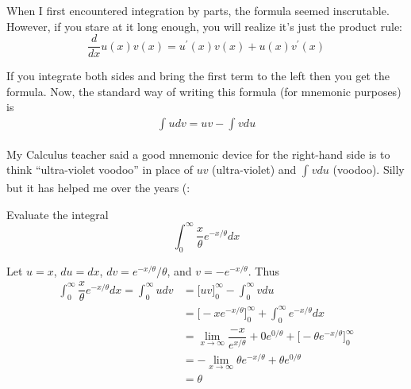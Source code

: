 \documentclass{article}
\begin{document}
\begin{enumerate}
    \begin{remark}
      When I first encountered integration by parts, the formula seemed inscrutable. However, if you stare at it long enough, you will realize it's just the product rule:
      \[
        \dfrac{d}{dx} u(x) v(x) = u^\prime(x) v(x) + u(x) v^\prime(x)
      \]

      If you integrate both sides and bring the first term to the left then you get the formula. Now, the standard way of writing this formula (for mnemonic purposes) is
      \begin{align*}
        \int_{}^{} u dv = uv - \int_{}^{} v du
      \end{align*}

      My Calculus teacher said a good mnemonic device for the right-hand side is to think ``ultra-violet voodoo'' in place of $uv$ (ultra-violet) and $\int_{}^{} v du$ (voodoo). Silly but it has helped me over the years (:
    \end{remark}
    \begin{example}
      Evaluate the integral
      \[
        \int_{0}^{\infty} \dfrac{x}{\theta} e^{-x / \theta} dx
      \]

      Let $u = x$, $du = dx$, $dv = e^{-x / \theta} / \theta$, and $v = - e^{-x / \theta}$. Thus
      \begin{align*}
        \int_{0}^{\infty} \dfrac{x}{\theta} e^{-x / \theta} dx
        =
        \int_{0}^{\infty} u dv
        &
        =
        \Big[
          uv
        \Big]_{0}^{\infty}
        -
        \int_{0}^{\infty} v du
        \\
        &
        =
        \Big[
          - x e^{-x / \theta}
        \Big]_{0}^{\infty}
        +
        \int_{0}^{\infty} e^{-x / \theta} dx
        \\
        &
        =
        \lim_{x \to \infty} \dfrac{- x}{e^{x / \theta}}
        + 0 e^{0 / \theta}
        + \Big[
          - \theta
          e^{-x / \theta}
        \Big]_{0}^{\infty}
        \\
        &
        =
        - \lim_{x \to \infty} \theta e^{-x / \theta}
        + \theta e^{0 / \theta}
        \\
        &
        =
        \theta
      \end{align*}
    \end{example}
\end{enumerate}

\clearpage
\printindex

\end{document}
